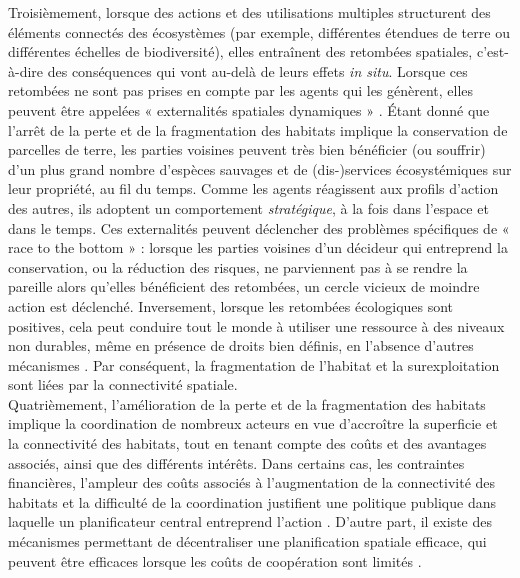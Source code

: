 \begin{displayquote}
\begin{displayquote}
\begin{displayquote}
Troisièmement, lorsque des actions et des utilisations multiples structurent des éléments connectés des écosystèmes (par exemple, différentes étendues de terre ou différentes échelles de biodiversité), elles entraînent des retombées spatiales, c'est-à-dire des conséquences qui vont au-delà de leurs effets \textit{in situ}. Lorsque ces retombées ne sont pas prises en compte par les agents qui les génèrent, elles peuvent être appelées « externalités spatiales dynamiques » \citep{sanchirico_bioeconomics_1999, costello_optimal_2008, costello_private_2017}. Étant donné que l'arrêt de la perte et de la fragmentation des habitats implique la conservation de parcelles de terre, les parties voisines peuvent très bien bénéficier (ou souffrir) d'un plus grand nombre d'espèces sauvages et de (dis-)services écosystémiques sur leur propriété, au fil du temps. Comme les agents réagissent aux profils d'action des autres, ils adoptent un comportement \textit{stratégique}, à la fois dans l'espace et dans le temps. Ces externalités peuvent déclencher des problèmes spécifiques de « race to the bottom » \citep{costello_private_2017} : lorsque les parties voisines d'un décideur qui entreprend la conservation, ou la réduction des risques, ne parviennent pas à se rendre la pareille alors qu'elles bénéficient des retombées, un cercle vicieux de moindre action est déclenché. Inversement, lorsque les retombées écologiques sont positives, cela peut conduire tout le monde à utiliser une ressource à des niveaux non durables, même en présence de droits bien définis, en l'absence d'autres mécanismes \citep{janmaat_sharing_2005,kaffine_unitization_2010}. 
Par conséquent, la fragmentation de l'habitat et la surexploitation sont liées par la connectivité spatiale. 
\\
Quatrièmement, l'amélioration de la perte et de la fragmentation des habitats implique la coordination de nombreux acteurs en vue d'accroître la superficie et la connectivité des habitats, tout en tenant compte des coûts et des avantages associés, ainsi que des différents intérêts.
Dans certains cas, les contraintes financières, l'ampleur des coûts associés à l'augmentation de la connectivité des habitats et la difficulté de la coordination justifient une politique publique dans laquelle un planificateur central entreprend l'action \citep{Mouysset2012}. D'autre part, il existe des mécanismes permettant de décentraliser une planification spatiale efficace, qui peuvent être efficaces lorsque les coûts de coopération sont limités \citep{costello_private_2017, bareille_agglomeration_2023}. 


\end{displayquote}
\end{displayquote}
\end{displayquote}
